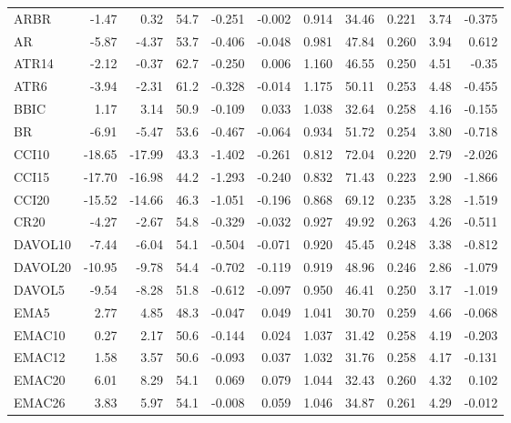 \documentclass[preprint,12pt]{elsarticle}
\begin{document}
{\begin{longtable}{lrrrrrrrrrr}
\bottomrule
\endlastfoot
    ARBR &   -1.47 &  0.32 &   54.7 &   -0.251 & -0.002 & 0.914 &     34.46 & 0.221 & 3.74 & -0.375 \\
    AR &   -5.87 &  -4.37 &   53.7 &   -0.406 & -0.048 & 0.981 &     47.84 & 0.260  & 3.94 & 0.612 \\
    ATR14 &   -2.12 &  -0.37 &   62.7 &   -0.250 & 0.006 & 1.160 &     46.55 & 0.250  & 4.51 & -0.35 \\
    ATR6 &   -3.94 &  -2.31 &   61.2 &   -0.328 & -0.014 & 1.175 &     50.11 & 0.253  & 4.48 & -0.455 \\
    BBIC &   1.17 &  3.14 &   50.9 &   -0.109 & 0.033 & 1.038 &     32.64 & 0.258  & 4.16 & -0.155 \\
    BR &   -6.91 &  -5.47 &   53.6 &   -0.467 & -0.064 & 0.934 &     51.72 & 0.254  & 3.80 & -0.718 \\
    CCI10 &   -18.65 &  -17.99 &   43.3 &   -1.402 & -0.261 & 0.812 &     72.04 & 0.220  & 2.79 & -2.026 \\
    CCI15 &   -17.70 &  -16.98 &   44.2 &   -1.293 & -0.240 & 0.832 &     71.43 & 0.223 & 2.90 & -1.866 \\
    CCI20 &   -15.52 &  -14.66 &   46.3 &   -1.051 & -0.196 & 0.868 &     69.12 & 0.235 & 3.28 & -1.519 \\
    CR20 &   -4.27 &  -2.67 &   54.8 &   -0.329 & -0.032 & 0.927 &     49.92 & 0.263 & 4.26 & -0.511 \\
    DAVOL10 &   -7.44 &  -6.04 &   54.1 &   -0.504 & -0.071 & 0.920 &     45.45 & 0.248 & 3.38 & -0.812 \\
    DAVOL20 &   -10.95 &  -9.78 &   54.4 &   -0.702 & -0.119 & 0.919 &     48.96 & 0.246 & 2.86 & -1.079 \\
    DAVOL5 &   -9.54 &  -8.28 &   51.8 &   -0.612 & -0.097 & 0.950 &     46.41 & 0.250 & 3.17 & -1.019 \\
    EMA5 &   2.77 &  4.85 &   48.3 &   -0.047 & 0.049 & 1.041 &     30.70 & 0.259 & 4.66 & -0.068 \\
    EMAC10 &   0.27 &  2.17 &   50.6 &   -0.144 & 0.024 & 1.037 &     31.42 & 0.258 & 4.19 & -0.203 \\
    EMAC12 &   1.58 &  3.57 &   50.6 &   -0.093 & 0.037 & 1.032 &     31.76 & 0.258 & 4.17 & -0.131 \\
    EMAC20 &   6.01 &  8.29 &   54.1 &   0.069 & 0.079 & 1.044 &     32.43 & 0.260 & 4.32 & 0.102 \\
    EMAC26 &   3.83 &  5.97 &   54.1 &   -0.008 & 0.059 & 1.046 &     34.87 & 0.261 & 4.29 & -0.012 \\

\end{longtable}}
\end{document}
